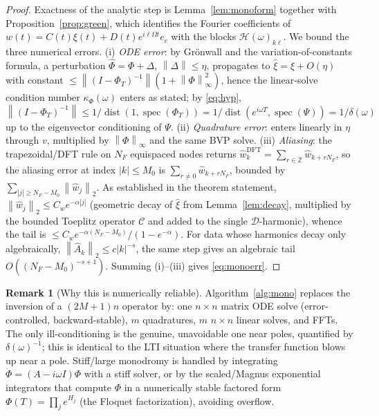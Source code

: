 \documentclass{amsart}
\theoremstyle{definition}
\newtheorem{remark}{Remark}
\DeclareMathOperator{\spec}{spec}
\DeclareMathOperator{\dist}{dist}
\newcommand{\Z}{\mathbb{Z}}
\newcommand{\norm}[1]{\left\lVert#1\right\rVert}
\newcommand{\Ccal}{\mathcal{C}}
\newcommand{\Dcal}{\mathcal{D}}
\newcommand{\Hcal}{\mathcal{H}}
\begin{document}
\begin{proof}
Exactness of the analytic step is Lemma~\ref{lem:monoform} together with
Proposition~\ref{prop:green}, which identifies the Fourier coefficients of
$w(t)=C(t)\xi(t)+D(t)e^{i\ell\Omega t}e_c$ with the blocks
$\Hcal(\omega)_{k\ell}$. We bound the three numerical errors. (i) \emph{ODE
error}: by Gr\"onwall and the variation-of-constants formula, a perturbation
$\hat\Phi=\Phi+\Delta$, $\norm\Delta\le\eta$, propagates to
$\hat\xi=\xi+O(\eta)$ with constant
$\le \norm{(I-\Phi_T)^{-1}}(1+\norm{\Phi}_\infty^2)$, hence the linear-solve
condition number $\kappa_\Phi(\omega)$ enters as stated; by \eqref{eq:hyp},
$\norm{(I-\Phi_T)^{-1}}\le 1/\dist(1,\spec(\Phi_T))=
1/\dist(e^{i\omega T},\spec(\Psi))=1/\delta(\omega)$ up to the eigenvector
conditioning of $\Psi$. (ii) \emph{Quadrature error}: enters linearly in $\eta$
through $v$, multiplied by $\norm{\Phi}_\infty$ and the same BVP solve. (iii)
\emph{Aliasing}: the trapezoidal/DFT rule on $N_F$ equispaced nodes
returns $\widehat w_k^{\mathrm{DFT}}=\sum_{r\in\Z}\hat w_{k+rN_F}$, so the
aliasing error at index $|k|\le M_0$ is $\sum_{r\ne0}\hat w_{k+rN_F}$, bounded by
$\sum_{|j|\ge N_F-M_0}\norm{\hat w_j}_2$. As established in the theorem statement,
$\norm{\hat w_j}_2\le C_w e^{-\alpha|j|}$ (geometric decay of $\hat\xi$ from
Lemma~\ref{lem:decay}, multiplied by the bounded Toeplitz operator $\Ccal$ and
added to the single $\Dcal$-harmonic), whence the tail is
$\le C_w e^{-\alpha(N_F-M_0)}/(1-e^{-\alpha})$. For data whose harmonics decay
only algebraically, $\norm{\hat A_k}_2\le c|k|^{-s}$, the same step gives an
algebraic tail $O((N_F-M_0)^{-s+1})$. Summing (i)--(iii) gives
\eqref{eq:monoerr}.
\end{proof}

\begin{remark}[Why this is numerically reliable]
Algorithm~\ref{alg:mono} replaces the inversion of a $(2M{+}1)n$ operator by:
one $n\times n$ matrix ODE solve (error-controlled, backward-stable), $m$
quadratures, $m$ $n\times n$ linear solves, and FFTs. The only ill-conditioning
is the genuine, unavoidable one near poles, quantified by $\delta(\omega)^{-1}$;
this is identical to the LTI situation where the transfer function blows up near
a pole. Stiff/large monodromy is handled by integrating $\dot\Phi=(A-i\omega
I)\Phi$ with a stiff solver, or by the scaled/Magnus exponential integrators
that compute $\Phi$ in a numerically stable factored form
$\Phi(T)=\prod_j e^{H_j}$ (the Floquet factorization), avoiding overflow.
\end{remark}
\end{document}
